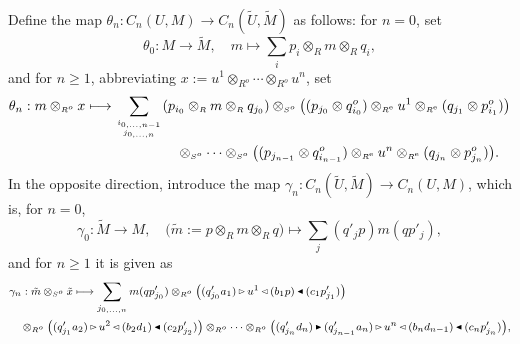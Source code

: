 \documentclass[reqno, a4paper, 10pt]{amsart}
\numberwithin{equation}{section}
\theoremstyle{plain}
\theoremstyle{definition}
\theoremstyle{remark}
\begin{document}
Define the map $\theta_n: C_n(U,M) \to C_n(\tilde{U},\tilde{M})$ as follows: for $n=0$, set
$$
\theta_0: M \longrightarrow \tilde{M}, \quad m \longmapsto \sum_i p_i \otimes_{{\scriptscriptstyle{R}}} m \otimes_{{\scriptscriptstyle{R}}} q_i,
$$
and for $n \geq 1$, abbreviating $x:= u^1 \otimes_{{\scriptscriptstyle{{R^{o}}}}} \cdots \otimes_{{\scriptscriptstyle{{R^{o}}}}} u^n$, set
\begin{equation}
\label{recattolico1}
\begin{split}
\theta_n: 
m \otimes_{{\scriptscriptstyle{{R^{o}}}}} x \longmapsto  \sum_{\scriptscriptstyle{i_{0, \ldots, {n-1}}} \atop \scriptscriptstyle{j_{0, \ldots, n}}} 
 & (p_{i_0} \otimes_{{\scriptscriptstyle{R}}} m \otimes_{{\scriptscriptstyle{R}}} q_{j_0}) \otimes_{{\scriptscriptstyle{{S^{o}}}}} \big((p_{j_0} \otimes q_{i_0}^o) \otimes_{{\scriptscriptstyle{{R^{\rm e}}}}} u^1 \otimes_{{\scriptscriptstyle{{R^{\rm e}}}}} (q_{j_1} \otimes p_{i_1}^o)\big) \\
&\quad \otimes_{{\scriptscriptstyle{{S^{o}}}}}  \cdots \otimes_{{\scriptscriptstyle{{S^{o}}}}} \big((p_{j_{n-1}} \otimes q_{i_{n-1}}^o) \otimes_{{\scriptscriptstyle{{R^{\rm e}}}}} u^{n} \otimes_{{\scriptscriptstyle{{R^{\rm e}}}}} (q_{j_{n}} \otimes p_{j_{n}}^o)\big). 
\end{split}
\end{equation}
In the opposite direction, introduce the map $\gamma_n: C_n(\tilde{U},\tilde{M}) \to  C_n(U,M)$, which is, for $n=0$,
$$
\gamma_0: \tilde{M} \longrightarrow M, \quad \big( {\tilde{{m}}}:=p \otimes_{{\scriptscriptstyle{R}}} m \otimes_{{\scriptscriptstyle{R}}} q\big) \longmapsto \sum_{j}(q'_jp)m(qp'_j),
$$
and for $n \geq 1$ it is given as
\begin{equation}
\label{reinacattolica1}
\begin{footnotesize}
{
\begin{split}
& \gamma_n:  \tilde{m} \otimes_{{\scriptscriptstyle{{S^{o}}}}} \tilde{x} \longmapsto  \sum_{j_{0, \ldots, n}} 
 m(q p'_{j_0}) \otimes_{{\scriptscriptstyle{{R^{o}}}}} {\big( { (q'_{j_0}a_1) {{\,\raise1pt\hbox{$\scriptscriptstyle{\rhd}$} \, }} u^1 {{\,\raise1pt\hbox{$\scriptscriptstyle{\lhd}$} \, }} (b_1p) {{\,\raise1pt\hbox{$\scriptscriptstyle{\blacktriangleleft}$} \, }} (c_1p'_{j_1}) } \big)} \\
& \quad  \otimes_{{\scriptscriptstyle{{R^{o}}}}} {\big( {(q'_{j_1}a_2) {{\,\raise1pt\hbox{$\scriptscriptstyle{\rhd}$} \, }} u^2 {{\,\raise1pt\hbox{$\scriptscriptstyle{\lhd}$} \, }} (b_2d_1) {{\,\raise1pt\hbox{$\scriptscriptstyle{\blacktriangleleft}$} \, }} (c_2p'_{j_2})} \big)} \otimes_{{\scriptscriptstyle{{R^{o}}}}} 
\cdots \otimes_{{\scriptscriptstyle{{R^{o}}}}} {\big( {(q'_{j_n} d_n) {{\,\raise1pt\hbox{$\scriptscriptstyle{\blacktriangleright}$} \, }} (q'_{j_{n-1}}a_n) {{\,\raise1pt\hbox{$\scriptscriptstyle{\rhd}$} \, }}  u^n {{\,\raise1pt\hbox{$\scriptscriptstyle{\lhd}$} \, }} (b_nd_{n-1}) {{\,\raise1pt\hbox{$\scriptscriptstyle{\blacktriangleleft}$} \, }} (c_np'_{j_n})} \big)},
\end{split} }
\end{footnotesize}
\end{equation}
\end{document}
